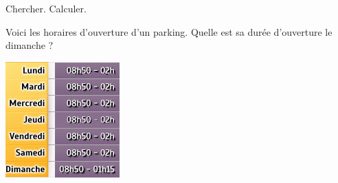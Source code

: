 \begin{pageAD}
  


\begin{ExoCad}{Chercher. Calculer.}

\begin{minipage}{0.70\linewidth}
Voici les horaires d'ouverture d'un parking. Quelle est sa durée d'ouverture le dimanche ? 
\end{minipage}
\begin{minipage}{0.30\linewidth}
 
 \begin{center}
 \includegraphics[scale=0.7]{FIG/grandeurs_mesures/horaires_parking.jpg} 
 \end{center}
\end{minipage}

\end{ExoCad}

\end{pageAD}

